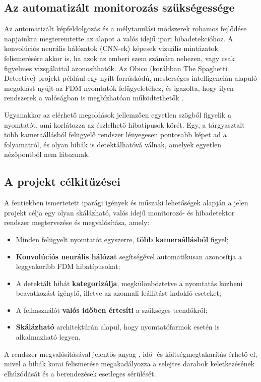 \subsection{Az automatizált monitorozás szükségessége}

Az automatizált képfeldolgozás és a mélytanulási módszerek rohamos fejlődése napjainkra megteremtette
az alapot a valós idejű ipari hibadetekcióhoz. A konvolúciós neurális
hálózatok (CNN-ek) képesek vizuális mintázatok felismerésére akkor is, ha azok az emberi szem
számára nehezen, vagy csak figyelmes vizsgálattal azonosíthatók. Az Obico (korábban The Spaghetti
Detective) projekt például egy nyílt forráskódú, mesterséges intelligencián alapuló megoldást nyújt
az FDM nyomtatók felügyeletéhez, és igazolta, hogy ilyen rendszerek a valóságban is megbízhatóan
működtethetők \cite{obico2021}.

Ugyanakkor az elérhető megoldások jellemzően egyetlen szögből figyelik a nyomtatót, ami korlátozza
az észlelhető hibatípusok körét. Egy, a tárgyasztalt több kameraállásból felügyelő rendszer
lényegesen pontosabb képet ad a folyamatról, és olyan hibák is detektálhatóvá válnak, amelyek
egyetlen nézőpontból nem látszanak.

\subsection{A projekt célkitűzései}

A fentiekben ismertetett iparági igények és műszaki lehetőségek alapján a jelen projekt célja egy
olyan skálázható, valós idejű monitorozó- és hibadetektor rendszer megtervezése és megvalósítása,
amely:

\begin{itemize}
    \item Minden felügyelt nyomtatót egyszerre, \textbf{több kameraállásból} figyel;
    \item \textbf{Konvolúciós neurális hálózat} segítségével automatikusan azonosítja a leggyakoribb
    FDM hibatípusokat;
    \item A detektált hibát \textbf{kategorizálja}, megkülönböztetve a nyomtatás közbeni
    beavatkozást igénylő, illetve az azonnali leállítást indokló eseteket;
    \item A felhasználót \textbf{valós időben értesíti} a szükséges teendőkről;
    \item \textbf{Skálázható} architektúrán alapul, hogy nyomtatófarmok esetén is alkalmazható legyen.
\end{itemize}

A rendszer megvalósításával jelentős anyag-, idő- és költségmegtakarítás érhető el, mivel a hibák
korai felismerése megakadályozza a selejtes darabok keletkezésének elhúzódását és a berendezések
esetleges sérülését.
